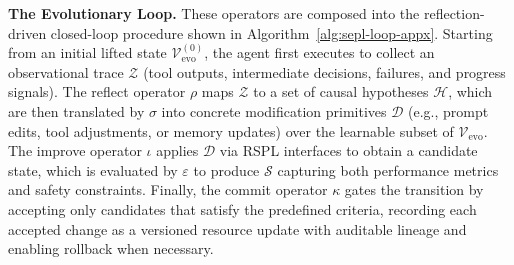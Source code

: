 \textbf{The Evolutionary Loop.}
These operators are composed into the reflection-driven closed-loop procedure shown in Algorithm~\ref{alg:sepl-loop-appx}. Starting from an initial lifted state $\mathcal{V}_{\text{evo}}^{(0)}$, the agent first executes to collect an observational trace $\mathcal{Z}$ (tool outputs, intermediate decisions, failures, and progress signals). The reflect operator $\rho$ maps $\mathcal{Z}$ to a set of causal hypotheses $\mathcal{H}$, which are then translated by $\sigma$ into concrete modification primitives $\mathcal{D}$ (e.g., prompt edits, tool adjustments, or memory updates) over the learnable subset of $\mathcal{V}_{\text{evo}}$. The improve operator $\iota$ applies $\mathcal{D}$ via RSPL interfaces to obtain a candidate state, which is evaluated by $\varepsilon$ to produce $\mathcal{S}$ capturing both performance metrics and safety constraints. Finally, the commit operator $\kappa$ gates the transition by accepting only candidates that satisfy the predefined criteria, recording each accepted change as a versioned resource update with auditable lineage and enabling rollback when necessary.

